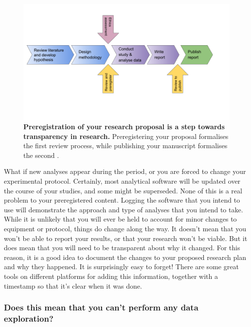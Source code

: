 \documentclass[
]{krantz}
\begin{document}
\begin{figure}
\includegraphics[width=0.95\linewidth]{figures/preregistration} \caption{\textbf{Preregistration of your research proposal is a step towards transparency in research.} Preregistering your proposal formalises the first review process, while publishing your manuscript formalises the second \citep[after][]{scheel2020registered}.}\label{fig:preregistration}
\end{figure}

What if new analyses appear during the period, or you are forced to change your experimental protocol. Certainly, most analytical software will be updated over the course of your studies, and some might be superseded. None of this is a real problem to your preregistered content. Logging the software that you intend to use will demonstrate the approach and type of analyses that you intend to take. While it is unlikely that you will ever be held to account for minor changes to equipment or protocol, things do change along the way. It doesn't mean that you won't be able to report your results, or that your research won't be viable. But it does mean that you will need to be transparent about why it changed. For this reason, it is a good idea to document the changes to your proposed research plan and why they happened. It is surprisingly easy to forget! There are some great tools on different platforms for adding this information, together with a timestamp so that it's clear when it was done.

\hypertarget{does-this-mean-that-you-cant-perform-any-data-exploration}{%
\subsubsection{Does this mean that you can't perform any data exploration?}\label{does-this-mean-that-you-cant-perform-any-data-exploration}}
\end{document}
